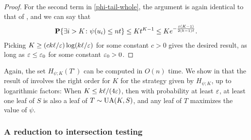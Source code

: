 \begin{proof}
  For the second term in \eqref{phi-tail-whole}, the argument is again
  identical to that of \cite[Theorem 3]{finding-adam}, and we can say
  that
  \begin{align*}
    \operatorname{\mathbf{P}}\{\exists i > K \colon \psi(u_i) \le nt\} \le K t^{K - 1} \le K e^{-\frac{\varepsilon (K - 1)}{2 (k - 1)\ell}} .
  \end{align*}
  Picking $K \ge (c k \ell/\varepsilon) \log (k\ell/\varepsilon)$ for some constant
  $c > 0$ gives the desired result, as long as $\varepsilon \le \varepsilon_0$ for
  some constant $\varepsilon_0 > 0$.
\end{proof}
Again, the set $H_{\psi; K}(T^\circ)$ can be computed in $O(n)$
time. We show in  that the result of
 involves the right order for $K$ for the strategy
given by $H_{\psi; K}$, up to logarithmic factors: When
$K \le k \ell/(4 \varepsilon)$, then with probability at least $\varepsilon$, at
least one leaf of $S$ is also a leaf of $T \sim \operatorname{UA}(K, S)$, and any
leaf of $T$ maximizes the value of $\psi$.

\subsubsection{A reduction to intersection testing}

